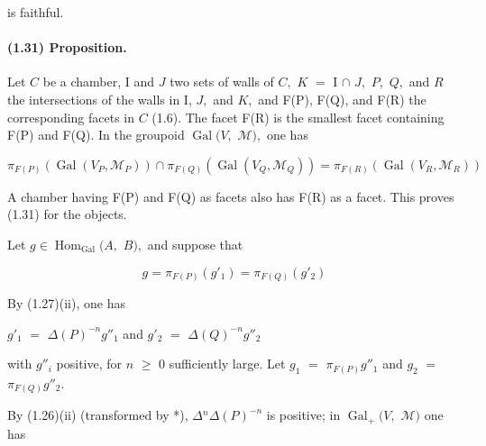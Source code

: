 \documentclass[10pt,a4paper]{article}
\begin{document}
is faithful.\par

\paragraph{(1.31) Proposition.} Let \ensuremath{C} be a chamber, I and \ensuremath{J} two sets of walls of \ensuremath{C,} \ensuremath{K} \ensuremath{=} I \ensuremath{\cap{}} \ensuremath{J,} \ensuremath{P,} \ensuremath{Q,} and \ensuremath{R} the intersections of the walls in I, \ensuremath{J,} and \ensuremath{K,} and F(P), F(Q), and F(R) the corresponding facets in \ensuremath{C} (1.6). The facet F(R) is the smallest facet containing F(P) and F(Q). In the groupoid \ensuremath{\operatorname{Gal}(V,} \ensuremath{\mathcal{M}),} one has

\[
\pi{}_{F(P)}(\operatorname{Gal}(V_P, \mathcal{M}_P)) \cap{} \pi{}_{F(Q)}(\operatorname{Gal}(V_Q, \mathcal{M}_Q)) = \pi{}_{F(R)}(\operatorname{Gal}(V_R, \mathcal{M}_R))
\]

A chamber having F(P) and F(Q) as facets also has F(R) as a facet. This proves (1.31) for the objects.\par

Let \ensuremath{g\in{}\operatorname{Hom}_{\operatorname{Gal}}(A,} \ensuremath{B),} and suppose that\par

\[
g = \pi{}_{F(P)}(g'_1) = \pi{}_{F(Q)}(g'_2)
\]


By (1.27)(ii), one has\par

\ensuremath{g'_1} \ensuremath{=} \ensuremath{\Delta{}(P)^{-n}g''_1} and \ensuremath{g'_2} \ensuremath{=} \ensuremath{\Delta{}(Q)^{-n}g''_2}\par

with \ensuremath{g''_i} positive, for \ensuremath{n} \ensuremath{\ge{}} 0 sufficiently large. Let \ensuremath{g_1} \ensuremath{=} \ensuremath{\pi{}_{F(P)}g''_1} and \ensuremath{g_2} \ensuremath{=} \ensuremath{\pi{}_{F(Q)}g''_2.}\par

By (1.26)(ii) (transformed by *), \ensuremath{\Delta{}^n\Delta{}(P)^{-n}} is positive; in \ensuremath{\operatorname{Gal}_+(V,} \ensuremath{\mathcal{M})} one has\par
\end{document}
